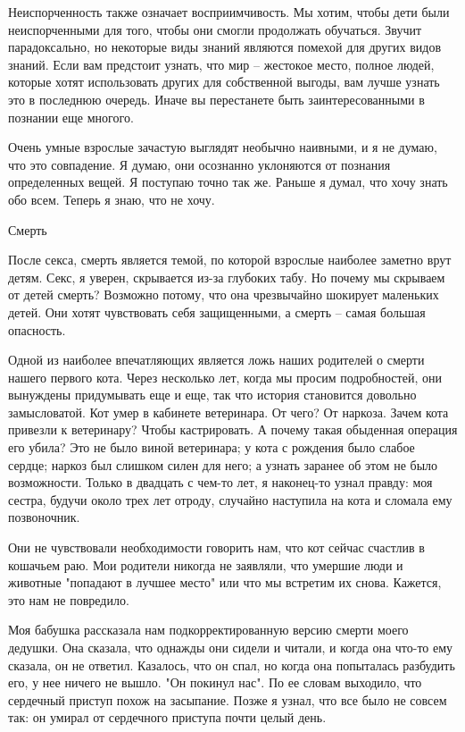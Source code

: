 \documentclass[ebook,12pt,oneside,openany]{memoir}
\begin{document}
Неиспорченность также означает восприимчивость. Мы хотим, чтобы дети
были неиспорченными для того, чтобы они смогли продолжать обучаться.
Звучит парадоксально, но некоторые виды знаний являются помехой для
других видов знаний. Если вам предстоит узнать, что мир -- жестокое
место, полное людей, которые хотят использовать других для собственной
выгоды, вам лучше узнать это в последнюю очередь. Иначе вы перестанете
быть заинтересованными в познании еще многого.

Очень умные взрослые зачастую выглядят необычно наивными, и я не
думаю, что это совпадение. Я думаю, они осознанно уклоняются от
познания определенных вещей. Я поступаю точно так же. Раньше я думал,
что хочу знать обо всем. Теперь я знаю, что не хочу.

Смерть

После секса, смерть является темой, по которой взрослые наиболее
заметно врут детям. Секс, я уверен, скрывается из-за глубоких табу. Но
почему мы скрываем от детей смерть? Возможно потому, что она
чрезвычайно шокирует маленьких детей. Они хотят чувствовать себя
защищенными, а смерть -- самая большая опасность.

Одной из наиболее впечатляющих является ложь наших родителей о смерти
нашего первого кота. Через несколько лет, когда мы просим
подробностей, они вынуждены придумывать еще и еще, так что история
становится довольно замысловатой. Кот умер в кабинете ветеринара. От
чего? От наркоза. Зачем кота привезли к ветеринару? Чтобы
кастрировать. А почему такая обыденная операция его убила? Это не было
виной ветеринара; у кота с рождения было слабое сердце; наркоз был
слишком силен для него; а узнать заранее об этом не было возможности.
Только в двадцать с чем-то лет, я наконец-то узнал правду: моя сестра,
будучи около трех лет отроду, случайно наступила на кота и сломала ему
позвоночник.

Они не чувствовали необходимости говорить нам, что кот сейчас счастлив
в кошачьем раю. Мои родители никогда не заявляли, что умершие люди и
животные "попадают в лучшее место" или что мы встретим их снова.
Кажется, это нам не повредило.

Моя бабушка рассказала нам подкорректированную версию смерти моего
дедушки. Она сказала, что однажды они сидели и читали, и когда она
что-то ему сказала, он не ответил. Казалось, что он спал, но когда она
попыталась разбудить его, у нее ничего не вышло. "Он покинул нас". По
ее словам выходило, что сердечный приступ похож на засыпание. Позже я
узнал, что все было не совсем так: он умирал от сердечного приступа
почти целый день.
\end{document}
